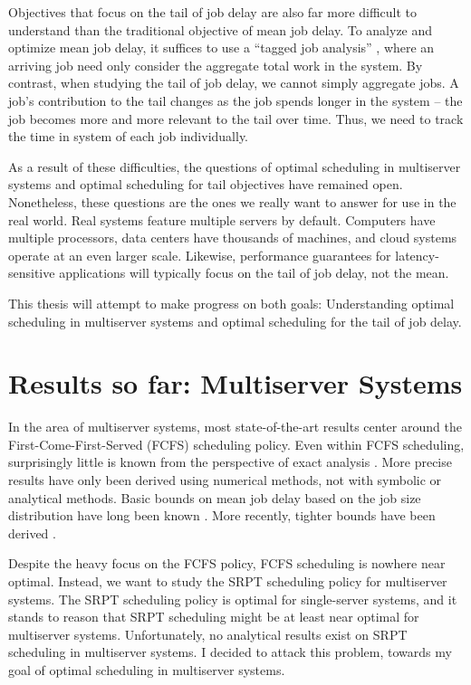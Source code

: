 \documentclass[11pt]{article}
\begin{document}
Objectives that focus on the tail of job delay are also far more difficult to understand
than the traditional objective of mean job delay.
To analyze and optimize mean job delay,
it suffices to use a ``tagged job analysis'' \cite{harchol2013performance},
where an arriving job need only consider the aggregate total work in the system.
By contrast, when studying the tail of job delay, we cannot simply aggregate jobs.
A job's contribution to the tail changes as the job spends longer in the system --
the job becomes more and more relevant to the tail over time.
Thus, we need to track the time in system of each job individually.

As a result of these difficulties,
the questions of optimal scheduling in multiserver systems
and optimal scheduling for tail objectives have remained open.
Nonetheless, these questions are the ones we really want to answer for use in the real world.
Real systems feature multiple servers by default.
Computers have multiple processors,
data centers have thousands of machines,
and cloud systems operate at an even larger scale.
Likewise, performance guarantees for latency-sensitive applications
will typically focus on the tail of job delay, not the mean.

This thesis will attempt to make progress on both goals:
Understanding optimal scheduling in multiserver systems
and optimal scheduling for the tail of job delay.

\section{Results so far: Multiserver Systems}

In the area of multiserver systems,
most state-of-the-art results center around the First-Come-First-Served (FCFS) scheduling policy.
Even within FCFS scheduling, surprisingly little is known from the perspective of exact analysis
\cite{Gupta2010} \cite{Gupta2011}.
More precise results have only been derived using numerical methods,
not with symbolic or analytical methods.
Basic bounds on mean job delay based on the job size distribution
have long been known \cite{doi:10.1111/j.2517-6161.1970.tb00819.x}.
More recently, tighter bounds have been derived \cite{daley1997some} \cite{Gupta:2011:TMB:1993744.1993792}.

Despite the heavy focus on the FCFS policy, FCFS scheduling is nowhere near optimal.
Instead, we want to study the SRPT scheduling policy for multiserver systems.
The SRPT scheduling policy is optimal for single-server systems,
and it stands to reason that SRPT scheduling might be at least near optimal
for multiserver systems.
Unfortunately, no analytical results exist on SRPT scheduling in multiserver systems.
I decided to attack this problem, towards my goal of optimal scheduling in multiserver systems.
\end{document}
